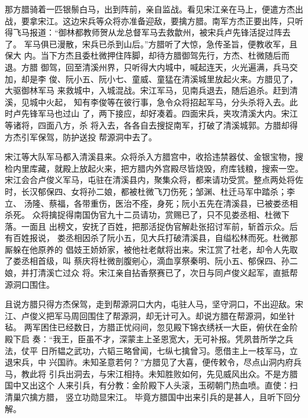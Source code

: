 那方腊骑着一匹银鬃白马，出到阵前，亲自监战。看见宋江亲在马上，便遣方杰出
战，要拿宋江。这边宋兵等众将亦准备迎敌，要擒方腊。南军方杰正要出阵，只听
得飞马报道：“御林都教师贺从龙总督军马去救歙州，被宋兵卢先锋活捉过阵去了。
军马俱已漫散，宋兵已杀到山后。”方腊听了大惊，急传圣旨，便教收军，且保大
内。当下方杰且委杜微押住阵脚，却待方腊御驾先行，方杰、杜微随后而退。方腊
御驾，回至清溪州界，只听得大内城中，喊起连天，火光遍满，兵马交加，却是李
俊、阮小五、阮小七、童威、童猛在清溪城里放起火来。方腊见了，大驱御林军马
来救城中，入城混战。宋江军马，见南兵退去，随后追杀。赶到清溪，见城中火起，
知有李俊等在彼行事，急令众将招起军马，分头杀将入去。此时卢先锋军马也过山
了，两下接应，却好凑着。四面宋兵，夹攻清溪大内。宋江等诸将，四面八方，杀
将入去，各各自去搜捉南军，打破了清溪城郭。方腊却得方杰引军保驾，防护送投
帮源洞中去了。

宋江等大队军马都入清溪县来。众将杀入方腊宫中，收拾违禁器仗、金银宝物，搜
检内里库藏，就殿上放起火来，把方腊内外宫殿尽皆烧毁，府库钱粮，搜索一空。
宋江会合卢俊义军马，屯驻在清溪县内，聚集众将，都来请功受赏。整点两处将佐
时，长汉郁保四、女将孙二娘，都被杜微飞刀伤死；邹渊、杜迁马军中踏杀；李立、
汤隆、蔡福，各带重伤，医治不痊，身死；阮小五先在清溪县，已被娄丞相杀死。
众将擒捉得南国伪官九十二员请功，赏赐已了，只不见娄丞相、杜微下落。一面且
出榜文，安抚了百姓，把那活捉伪官解赴张招讨军前，斩首示众。后有百姓报说，
娄丞相因杀了阮小五，见大兵打破清溪县，自缢松林而死。杜微那厮躲在他原养的
倡妓王娇娇家，被他社老献将出来。宋江赏了社老，却令人先取了娄丞相首级，叫
蔡庆将杜微剖腹剜心，滴血享祭秦明、阮小五、郁保四、孙二娘，并打清溪亡过众
将。宋江亲自拈香祭赛已了，次日与同卢俊义起军，直抵帮源洞口围住。

且说方腊只得方杰保驾，走到帮源洞口大内，屯驻人马，坚守洞口，不出迎敌。宋
江、卢俊义把军马周回围住了帮源洞，却无计可入。却说方腊在帮源洞，如坐针毡。
两军困住已经数日，方腊正忧闷间，忽见殿下锦衣绣袄一大臣，俯伏在金阶殿下启
奏：“我王，臣虽不才，深蒙主上圣恩宽大，无可补报。凭夙昔所学之兵法，仗平
日所韫之武功，六韬三略曾闻，七纵七擒曾习。愿借主上一枝军马，立退宋兵，中
兴国祚。未知圣意若何？”方腊见了大喜，便传敕令，尽点山洞内府兵马，教此将
引兵出洞去，与宋江相持。未知胜败如何，先见威风出众。不是方腊国中又出这个
人来引兵，有分教：金阶殿下人头滚，玉砌朝门热血喷。直使：扫清巢穴擒方腊，
竖立功勋显宋江。
毕竟方腊国中出来引兵的是甚人，且听下回分解。
